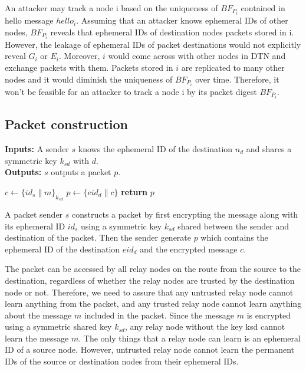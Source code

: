 \documentclass[11pt]{article}
\begin{document}
An attacker may track a node i based on the uniqueness of $BF_{P_i}$ contained in hello message $hello_i$. 
Assuming that an attacker knows ephemeral IDs of other nodes, $BF_{P_i}$ reveals that ephemeral IDs of destination nodes packets stored in i. However, the leakage of ephemeral IDs of packet destinations would not explicitly reveal $G_i$ or $E_i$. 
Moreover, $i$ would come across with other nodes in DTN and exchange packets with them. 
Packets stored in $i$ are replicated to many other nodes and it would diminish the uniqueness of $BF_{P_i}$ over time. 
Therefore, it won't be feasible for an attacker to track a node i by its packet digest $BF_{P_i}$.






\newpage
\subsection{Packet construction}

\begin{framed}
\noindent
\textbf{Inputs:} A sender $s$ knows the ephemeral ID of the destination $n_d$ and shares a symmetric key $k_{sd}$ with $d$. \\

\noindent
\textbf{Outputs:} $s$ outputs a packet $p$. \\

\begin{algorithmic}[1]
    \State $c \leftarrow \{id_s \| m\}_{k_{sd}}$
    \State $p \leftarrow \{eid_d \| c\}$
    \State \textbf{return} $p$
  \EndProcedure
\end{algorithmic}
\end{framed}


A packet sender $s$ constructs a packet by first encrypting the message along with its ephemeral ID $id_s$ using a symmetric key $k_{sd}$ shared between the sender and destination of the packet. 
Then the sender generate $p$ which contains the ephemeral ID of the destination $eid_d$ and the encrypted message $c$.


The packet can be accessed by all relay nodes on the route from the source to the destination, regardless of whether the relay nodes are trusted by the destination node or not. 
Therefore, we need to assure that any untrusted relay node cannot learn anything from the packet, and any trusted relay node cannot learn anything about the message $m$ included in the packet. 
Since the message $m$ is encrypted using a symmetric shared key $k_{sd}$, any relay node without the key ksd cannot learn the message $m$. 
The only things that a relay node can learn is an ephemeral ID of a source node. 
However, untrusted relay node cannot learn the permanent IDs of the source or destination nodes from their ephemeral IDs.
\end{document}
